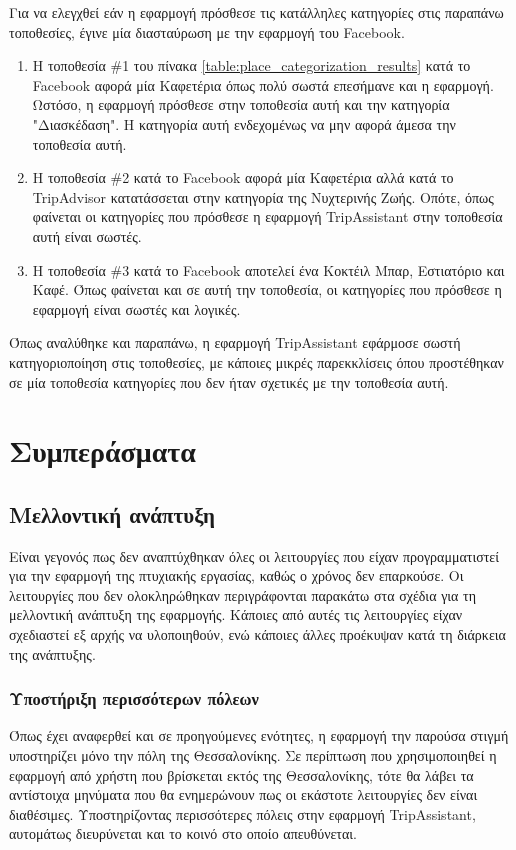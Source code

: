 \documentclass[oneside, 12pt]{book}
\begin{document}
Για να ελεγχθεί εάν η εφαρμογή πρόσθεσε τις κατάλληλες κατηγορίες στις παραπάνω τοποθεσίες, έγινε μία διασταύρωση με την εφαρμογή του Facebook.
\begin{enumerate}
    \item Η τοποθεσία \#1 του πίνακα \ref{table:place_categorization_results} κατά το Facebook αφορά μία Καφετέρια όπως πολύ σωστά επεσήμανε και η εφαρμογή. Ωστόσο, η εφαρμογή πρόσθεσε στην τοποθεσία αυτή και την κατηγορία "Διασκέδαση". Η κατηγορία αυτή ενδεχομένως να μην αφορά άμεσα την τοποθεσία αυτή.
    \item Η τοποθεσία \#2 κατά το Facebook αφορά μία Καφετέρια αλλά κατά το TripAdvisor κατατάσσεται στην κατηγορία της Νυχτερινής Ζωής. Οπότε, όπως φαίνεται οι κατηγορίες που πρόσθεσε η εφαρμογή TripAssistant στην τοποθεσία αυτή είναι σωστές.
    \item Η τοποθεσία \#3 κατά το Facebook αποτελεί ένα Κοκτέιλ Μπαρ, Εστιατόριο και Καφέ. Όπως φαίνεται και σε αυτή την τοποθεσία, οι κατηγορίες που πρόσθεσε η εφαρμογή είναι σωστές και λογικές.
\end{enumerate}
Όπως αναλύθηκε και παραπάνω, η εφαρμογή TripAssistant εφάρμοσε σωστή κατηγοριοποίηση στις τοποθεσίες, με κάποιες μικρές παρεκκλίσεις όπου προστέθηκαν σε μία τοποθεσία κατηγορίες που δεν ήταν σχετικές με την τοποθεσία αυτή.

\chapter{Συμπεράσματα}

\section{Μελλοντική ανάπτυξη}
Είναι γεγονός πως δεν αναπτύχθηκαν όλες οι λειτουργίες που είχαν 
προγραμματιστεί για την εφαρμογή της πτυχιακής εργασίας, καθώς ο 
χρόνος δεν επαρκούσε. Οι λειτουργίες που δεν ολοκληρώθηκαν 
περιγράφονται παρακάτω στα σχέδια για τη μελλοντική ανάπτυξη της 
εφαρμογής. Κάποιες από αυτές τις λειτουργίες είχαν σχεδιαστεί εξ 
αρχής να υλοποιηθούν, ενώ κάποιες άλλες προέκυψαν κατά τη διάρκεια 
της ανάπτυξης.

\subsection{Υποστήριξη περισσότερων πόλεων}
Όπως έχει αναφερθεί και σε προηγούμενες ενότητες, η εφαρμογή την 
παρούσα στιγμή υποστηρίζει μόνο την πόλη της Θεσσαλονίκης. 
Σε περίπτωση που χρησιμοποιηθεί η εφαρμογή από χρήστη που βρίσκεται 
εκτός της Θεσσαλονίκης, τότε θα λάβει τα αντίστοιχα μηνύματα που θα 
ενημερώνουν πως οι εκάστοτε λειτουργίες δεν είναι διαθέσιμες.
Υποστηρίζοντας περισσότερες πόλεις στην εφαρμογή TripAssistant, 
αυτομάτως διευρύνεται και το κοινό στο οποίο απευθύνεται.
\end{document}

